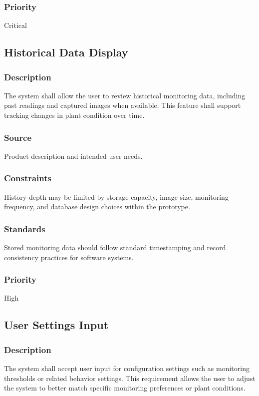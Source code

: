 \subsubsection{Priority}
Critical

\subsection{Historical Data Display}
\subsubsection{Description}
The system shall allow the user to review historical monitoring data, including past readings and captured images when available. This feature shall support tracking changes in plant condition over time.

\subsubsection{Source}
Product description and intended user needs.

\subsubsection{Constraints}
History depth may be limited by storage capacity, image size, monitoring frequency, and database design choices within the prototype.

\subsubsection{Standards}
Stored monitoring data should follow standard timestamping and record consistency practices for software systems.

\subsubsection{Priority}
High

\subsection{User Settings Input}
\subsubsection{Description}
The system shall accept user input for configuration settings such as monitoring thresholds or related behavior settings. This requirement allows the user to adjust the system to better match specific monitoring preferences or plant conditions.

